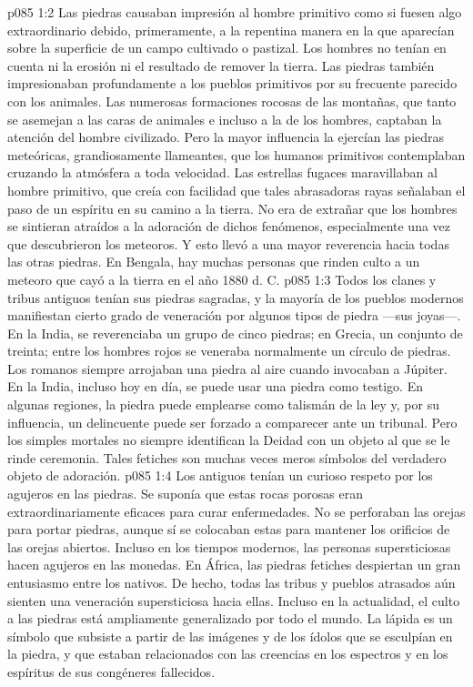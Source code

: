 \vs p085 1:2 Las piedras causaban impresión al hombre primitivo como si fuesen algo extraordinario debido, primeramente, a la repentina manera en la que aparecían sobre la superficie de un campo cultivado o pastizal. Los hombres no tenían en cuenta ni la erosión ni el resultado de remover la tierra. Las piedras también impresionaban profundamente a los pueblos primitivos por su frecuente parecido con los animales. Las numerosas formaciones rocosas de las montañas, que tanto se asemejan a las caras de animales e incluso a la de los hombres, captaban la atención del hombre civilizado. Pero la mayor influencia la ejercían las piedras meteóricas, grandiosamente llameantes, que los humanos primitivos contemplaban cruzando la atmósfera a toda velocidad. Las estrellas fugaces maravillaban al hombre primitivo, que creía con facilidad que tales abrasadoras rayas señalaban el paso de un espíritu en su camino a la tierra. No era de extrañar que los hombres se sintieran atraídos a la adoración de dichos fenómenos, especialmente una vez que descubrieron los meteoros. Y esto llevó a una mayor reverencia hacia todas las otras piedras. En Bengala, hay muchas personas que rinden culto a un meteoro que cayó a la tierra en el año 1880 d. C.
\vs p085 1:3 Todos los clanes y tribus antiguos tenían sus piedras sagradas, y la mayoría de los pueblos modernos manifiestan cierto grado de veneración por algunos tipos de piedra ---sus joyas---. En la India, se reverenciaba un grupo de cinco piedras; en Grecia, un conjunto de treinta; entre los hombres rojos se veneraba normalmente un círculo de piedras. Los romanos siempre arrojaban una piedra al aire cuando invocaban a Júpiter. En la India, incluso hoy en día, se puede usar una piedra como testigo. En algunas regiones, la piedra puede emplearse como talismán de la ley y, por su influencia, un delincuente puede ser forzado a comparecer ante un tribunal. Pero los simples mortales no siempre identifican la Deidad con un objeto al que se le rinde ceremonia. Tales fetiches son muchas veces meros símbolos del verdadero objeto de adoración.
\vs p085 1:4 Los antiguos tenían un curioso respeto por los agujeros en las piedras. Se suponía que estas rocas porosas eran extraordinariamente eficaces para curar enfermedades. No se perforaban las orejas para portar piedras, aunque sí se colocaban estas para mantener los orificios de las orejas abiertos. Incluso en los tiempos modernos, las personas supersticiosas hacen agujeros en las monedas. En África, las piedras fetiches despiertan un gran entusiasmo entre los nativos. De hecho, todas las tribus y pueblos atrasados aún sienten una veneración supersticiosa hacia ellas. Incluso en la actualidad, el culto a las piedras está ampliamente generalizado por todo el mundo. La lápida es un símbolo que subsiste a partir de las imágenes y de los ídolos que se esculpían en la piedra, y que estaban relacionados con las creencias en los espectros y en los espíritus de sus congéneres fallecidos.
